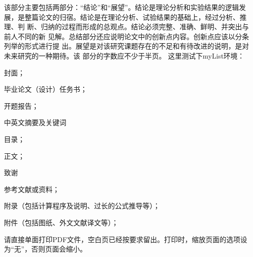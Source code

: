 
\begin{conclusion}
该部分主要包括两部分：“结论”和“展望”。结论是理论分析和实验结果的逻辑发
展，是整篇论文的归宿。结论是在理论分析、试验结果的基础上，经过分析、推理、判
断、归纳的过程而形成的总观点。结论必须完整、准确、鲜明、并突出与前人不同的新
见解。总结部分还应说明论文中的创新点内容。创新点应该以分条列举的形式进行提
出。展望是对该研究课题存在的不足和有待改进的说明，是对未来研究的一种期待。该
部分的字数应不少于半页。
这里测试下myList环境：
\begin{myList}
        \item 封面；
        \item 毕业论文（设计）任务书；
        \item 开题报告；
        \item 中英文摘要及关键词
        \item  目录；
        \item  正文；
        \item  致谢
        \item  参考文献或资料；
        \item  附录（包括计算程序及说明、过长的公式推导等）；
        \item  附件（包括图纸、外文文献译文等）；
\end{myList}

请直接单面打印PDF文件，空白页已经按要求留出。打印时，缩放页面的选项设
为“无”，否则页面会缩小。
\end{conclusion}